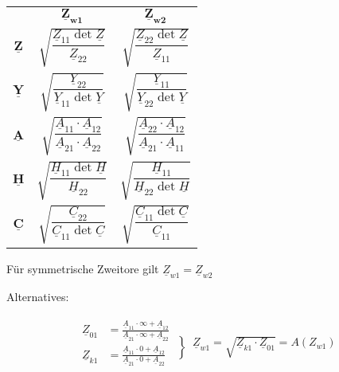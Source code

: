 \begin{mdframed}[style=exercise,frametitle=L\"osung des obigen Gleichungssystems]
    \begin{center}
        \begin{tabular}{c c c}
            & $\boldsymbol{\underline{Z}_{w1}}$ & $\boldsymbol{\underline{Z}_{w2}}$
            \vspace{5pt}\\
            $\underline{\boldsymbol{Z}}$ & $\sqrt{\dfrac{\underline{Z}_{11}\operatorname{det}\underline{Z}}{\underline{Z}_{22}}}$ & $\sqrt{\dfrac{\underline{Z}_{22}\operatorname{det}\underline{Z}}{\underline{Z}_{11}}}$
            \vspace{5pt}\\
            $\underline{\boldsymbol{Y}}$ & $\sqrt{\dfrac{\underline{Y}_{22}}{\underline{Y}_{11}\operatorname{det}\underline{Y}}}$ & $\sqrt{\dfrac{\underline{Y}_{11}}{\underline{Y}_{22}\operatorname{det}\underline{Y}}}$
            \vspace{5pt}\\
            $\underline{\boldsymbol{A}}$ & $\sqrt{\dfrac{\underline{A}_{11}\cdot\underline{A}_{12}}{\underline{A}_{21}\cdot\underline{A}_{22}}}$ & $\sqrt{\dfrac{\underline{A}_{22}\cdot\underline{A}_{12}}{\underline{A}_{21}\cdot\underline{A}_{11}}}$
            \vspace{5pt}\\
            $\underline{\boldsymbol{H}}$ & $\sqrt{\dfrac{\underline{H}_{11}\operatorname{det}\underline{H}}{\underline{H}_{22}}}$ & $\sqrt{\dfrac{\underline{H}_{11}}{\underline{H}_{22}\operatorname{det}\underline{H}}}$
            \vspace{5pt}\\
            $\underline{\boldsymbol{C}}$ & $\sqrt{\dfrac{\underline{C}_{22}}{\underline{C}_{11}\operatorname{det}\underline{C}}}$ & $\sqrt{\dfrac{\underline{C}_{11}\operatorname{det}\underline{C}}{\underline{C}_{11}}}$
            \vspace{5pt}\\
        \end{tabular}

        \footnotesize
        F\"ur symmetrische Zweitore gilt $\underline{Z}_{w1}=\underline{Z}_{w2}$
        \normalsize
    \end{center}
\end{mdframed}

Alternatives:
\begin{mdframed}[style=exercise,frametitle=Messtechnisch(Leerlauf und Kurzschluss)]
    \begin{align*}
        \begin{split}
            \underline{Z}_{01} &= \frac{\underline{A}_{11}\cdot\infty+\underline{A}_{12}}{\underline{A}_{21}\cdot\infty+\underline{A}_{22}}\\
            \underline{Z}_{k1} &= \frac{\underline{A}_{11}\cdot0+\underline{A}_{12}}{\underline{A}_{21}\cdot0+\underline{A}_{22}}
        \end{split}
    \left\} \
    \underline{Z}_{w1} = \sqrt{\underline{Z}_{k1}\cdot\underline{Z}_{01}}=A(Z_{w1})
    \right.
    \end{align*}
\end{mdframed}

